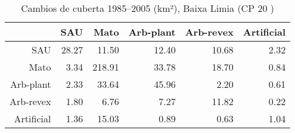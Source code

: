 \begin{table}[p]
\centering
\caption{Cambios de cuberta 1985--2005 (km²), Baixa Limia (CP 20 )} 
\label{TaboaContinxCP20}
\begin{tabular}{rrrrrr}
  \hline
 & SAU & Mato & Arb-plant & Arb-revex & Artificial \\ 
  \hline
SAU & 28.27 & 11.50 & 12.40 & 10.68 & 2.32 \\ 
  Mato & 3.34 & 218.91 & 33.78 & 18.70 & 0.84 \\ 
  Arb-plant & 2.33 & 33.64 & 45.96 & 2.20 & 0.61 \\ 
  Arb-revex & 1.80 & 6.76 & 7.27 & 11.82 & 0.22 \\ 
  Artificial & 1.36 & 15.03 & 0.89 & 0.63 & 1.04 \\ 
   \hline
\end{tabular}
\end{table}

